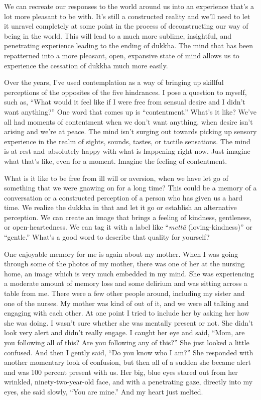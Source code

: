 We can recreate our responses to the world around us into an experience that's a lot more pleasant to be with. It's still a constructed reality and we'll need to let it unravel completely at some point in the process of deconstructing our way of being in the world. This will lead to a much more sublime, insightful, and penetrating experience leading to the ending of dukkha. The mind that has been repatterned into a more pleasant, open, expansive state of mind allows us to experience the cessation of dukkha much more easily.~

Over the years, I've used contemplation as a way of bringing up skillful perceptions of the opposites of the five hindrances. I pose a question to myself, such as, ``What would it feel like if I were free from sensual desire and I didn't want anything?'' One word that comes up is ``contentment.'' What's it like? We've all had moments of contentment when we don't want anything, when desire isn't arising and we're at peace. The mind isn't surging out towards picking up sensory experience in the realm of sights, sounds, tastes, or tactile sensations. The mind is at rest and~absolutely happy with what is happening right now. Just imagine what that's like, even for a moment. Imagine the feeling of contentment.~

What is it like to be free from ill will or aversion, when we have let go of something that we were gnawing on for a long time? This could be a memory of a conversation or a constructed perception of a person who has given us a hard time. We realize the dukkha in that and let it go or establish an alternative perception. We can create an image that brings a feeling of kindness, gentleness, or open-heartedness. We can tag it with a label like ``\emph{mettā} (loving-kindness)'' or ``gentle.'' What's a good word to describe that quality for yourself?~

One enjoyable memory for me is again about my mother. When I was going through some of the photos of my mother, there was one of her at the nursing home, an image which is very much embedded in my mind. She was experiencing a moderate amount of memory loss and some delirium and was sitting across a table from me. There were a few other people around, including my sister and one of the nurses. My mother was kind of out of it, and we were all talking and engaging with each other. At one point I tried to include her by asking her how she was doing. I wasn't sure whether she was mentally present or not. She didn't look very alert and didn't really engage. I caught her eye and said, ``Mom, are you following all of this? Are you following any of this?'' She just looked a little confused. And then I gently said, ``Do you know who I am?'' She responded with another momentary look of confusion, but then all of a sudden she became alert and was 100 percent present with us. Her big, blue eyes stared out from her wrinkled, ninety-two-year-old face, and with a penetrating gaze, directly into my eyes, she said slowly, ``You are mine.'' And my heart just melted.

